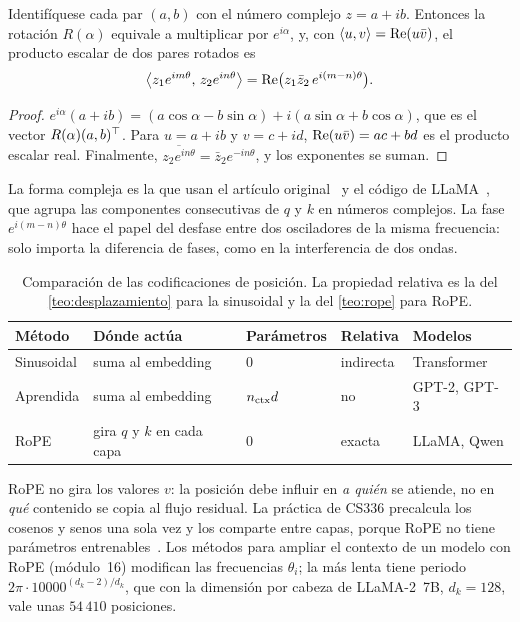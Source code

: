 \begin{proposicion}\label{prop:rope-compleja}
Identifíquese cada par $(a,b)$ con el número complejo $z=a+ib$. Entonces la rotación $R(\alpha)$ equivale a multiplicar por $e^{i\alpha}$, y, con $\langle u,v\rangle=\operatorname{Re}(u\bar v)$, el producto escalar de dos pares rotados es
\[
\bigl\langle z_1e^{im\theta},\,z_2e^{in\theta}\bigr\rangle=\operatorname{Re}\bigl(z_1\bar z_2\,e^{i(m-n)\theta}\bigr).
\]
\end{proposicion}

\begin{proof}
$e^{i\alpha}(a+ib)=(a\cos\alpha-b\sin\alpha)+i(a\sin\alpha+b\cos\alpha)$, que es el vector $R(\alpha)(a,b)^{\top}$. Para $u=a+ib$ y $v=c+id$, $\operatorname{Re}(u\bar v)=ac+bd$ es el producto escalar real. Finalmente, $\overline{z_2e^{in\theta}}=\bar z_2e^{-in\theta}$, y los exponentes se suman.
\end{proof}

La forma compleja es la que usan el artículo original~\cite[§3.2.1]{roformer} y el código de LLaMA~\cite{llamacode}, que agrupa las componentes consecutivas de $q$ y $k$ en números complejos. La fase $e^{i(m-n)\theta}$ hace el papel del desfase entre dos osciladores de la misma frecuencia: solo importa la diferencia de fases, como en la interferencia de dos ondas.

\begin{table}[ht]
\centering\small
\caption{Comparación de las codificaciones de posición. La propiedad relativa es la del \cref{teo:desplazamiento} para la sinusoidal y la del \cref{teo:rope} para RoPE.}\label{tab:posiciones}
\begin{tabular}{@{}lllll@{}}
\toprule
Método & Dónde actúa & Parámetros & Relativa & Modelos \\
\midrule
Sinusoidal & suma al embedding & $0$ & indirecta & Transformer \\
Aprendida & suma al embedding & $n_{\mathrm{ctx}} d$ & no & GPT-2, GPT-3 \\
RoPE & gira $q$ y $k$ en cada capa & $0$ & exacta & LLaMA, Qwen \\
\bottomrule
\end{tabular}
\end{table}

\begin{observacion}
RoPE no gira los valores $v$: la posición debe influir en \emph{a quién} se atiende, no en \emph{qué} contenido se copia al flujo residual. La práctica de CS336 precalcula los cosenos y senos una sola vez y los comparte entre capas, porque RoPE no tiene parámetros entrenables~\cite[§3.4.3]{cs336}. Los métodos para ampliar el contexto de un modelo con RoPE (módulo~16) modifican las frecuencias $\theta_i$; la más lenta tiene periodo $2\pi\cdot 10000^{(d_k-2)/d_k}$, que con la dimensión por cabeza de LLaMA-2~7B, $d_k=128$, vale unas $54\,410$ posiciones.
\end{observacion}

